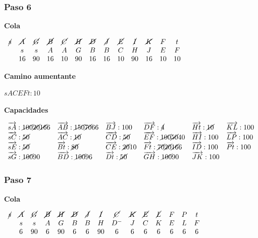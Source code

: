 \documentclass[10pt,a4paper]{article}
\begin{document}
\subsubsection*{Paso 6}

\textbf{Cola}

$\begin{array}{cccccccccccccc} \cancel{s} & \cancel{A} & \cancel{G} & \cancel{B} & \cancel{C} & \cancel{H} & \cancel{D} & \cancel{J} & \cancel{E} & \cancel{I} & \cancel{K} & F& t\\ & s & s & A & A & G & B &B & C & H & J & E &F\\ & 16 & 90 & 16 & 10 & 90&16& 16 & 10 & 90 & 16 & 10 &10 \end{array}$

\textbf{Camino aumentante}

$sACEFt:10$

\textbf{Capacidades}

$\begin{array}{llllll} \overrightarrow{sA}: \cancel{100}\cancel{20}\cancel{16}6& \overrightarrow{AB}: \cancel{150} \cancel{70}66&\overrightarrow{BJ}: 100&\overrightarrow{DF}: \cancel{4}&\overrightarrow{Ht}: \cancel{10}&\overrightarrow{KL}: 100\\ \overrightarrow{sC}: \cancel{50}& \overrightarrow{AC}: \cancel{10}&\overrightarrow{CD}: \cancel{50}&\overrightarrow{EF}: \cancel{100}\cancel{50}40&\overrightarrow{HI}: 100&\overrightarrow{LP}: 100\\ \overrightarrow{sE}: \cancel{50}& \overrightarrow{Bt}: \cancel{80}&\overrightarrow{CE}: \cancel{20}10 &\overrightarrow{Ft}: \cancel{70}\cancel{20}\cancel{16}6&\overrightarrow{ID}: 100&\overrightarrow{Pt}: 100\\ \overrightarrow{sG}: \cancel{100}90& \overrightarrow{BD}: \cancel{100}96&\overrightarrow{Dt}: \cancel{50}&\overrightarrow{GH}: \cancel{100}90&\overrightarrow{JK}: 100&\\ \end{array}$

\subsubsection*{Paso 7}

\textbf{Cola}

$\begin{array}{ccccccccccccccc} \cancel{s} & \cancel{A} & \cancel{G} &\cancel{B} & \cancel{H} & \cancel{D} & \cancel{J} & \cancel{I} & \cancel{C} & \cancel{K} & \cancel{E} & \cancel{L}& F & P & t\\ & s & s & A & G & B &B & H & D^{-} & J & C & K & E & L & F\\ & 6 & 90 & 6 & 90 &6 & 6 & 90 & 6 &6 & 6 & 6 & 6 & 6 & 6 \end{array}$
\end{document}
